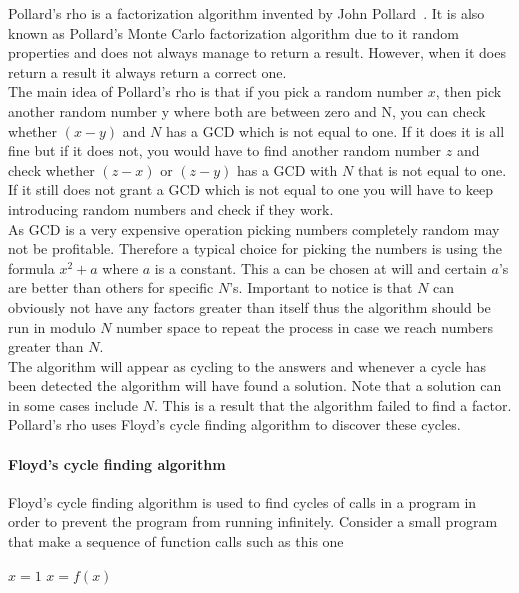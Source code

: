 Pollard's rho is a factorization algorithm invented by John Pollard~\cite{pollard}. It is also known as Pollard's Monte Carlo factorization algorithm due to it random properties and does not always manage to return a result. However, when it does return a result it always return a correct one. \\
The main idea of Pollard's rho is that if you pick a random number \(x\), then pick another random number y where both are between zero and N, you can check whether \((x-y)\) and \(N\) has a GCD which is not equal to one. If it does it is all fine but if it does not, you would have to find another random number \(z\) and check whether \((z-x)\) or \((z-y)\) has a GCD with \(N\) that is not equal to one. If it still does not grant a GCD which is not equal to one you will have to keep introducing random numbers and check if they work. \\
As GCD is a very expensive operation picking numbers completely random may not be profitable. Therefore a typical choice for picking the numbers is using the formula \(x^2 + a\) where \(a\) is a constant. This a can be chosen at will and certain \(a\)'s are better than others for specific \(N\)'s.
Important to notice is that \(N\) can obviously not have any factors greater than itself thus the algorithm should be run in modulo \(N\) number space to repeat the process in case we reach numbers greater than \(N\). \\
The algorithm will appear as cycling to the answers and whenever a cycle has been detected the algorithm will have found a solution. Note that a solution can in some cases include \(N\). This is a result that the algorithm failed to find a factor. Pollard's rho uses Floyd's cycle finding algorithm to discover these cycles.

\paragraph{Floyd's cycle finding algorithm}

Floyd's cycle finding algorithm is used to find cycles of calls in a program in order to prevent the program from running infinitely. Consider a small program that make a sequence of function calls such as this one

\begin{algorithm}
	\begin{algorithmic}
		\State $x = 1$
			\State $x = f(x)$
		\EndWhile	
	\end{algorithmic}
\end{algorithm}

